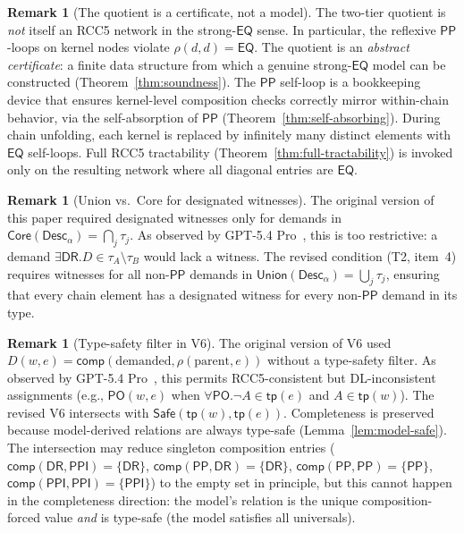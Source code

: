 \documentclass[a4paper,11pt]{article}
\theoremstyle{definition}
\newtheorem{remark}[theorem]{Remark}
\newcommand{\DR}{\ensuremath{\mathsf{DR}}}
\newcommand{\PO}{\ensuremath{\mathsf{PO}}}
\newcommand{\EQ}{\ensuremath{\mathsf{EQ}}}
\newcommand{\PP}{\ensuremath{\mathsf{PP}}}
\newcommand{\PPI}{\ensuremath{\mathsf{PPI}}}
\newcommand{\comp}{\ensuremath{\mathsf{comp}}}
\newcommand{\tp}{\ensuremath{\mathsf{tp}}}
\newcommand{\Desc}{\ensuremath{\mathsf{Desc}}}
\newcommand{\Core}{\ensuremath{\mathsf{Core}}}
\newcommand{\Union}{\ensuremath{\mathsf{Union}}}
\newcommand{\Safe}{\ensuremath{\mathsf{Safe}}}
\begin{document}
\begin{remark}[The quotient is a certificate, not a model]
\label{rem:certificate}
The two-tier quotient is \emph{not} itself an RCC5 network in the
strong-$\EQ$ sense.  In particular, the reflexive $\PP$-loops on
kernel nodes violate $\rho(d,d) = \EQ$.  The quotient is an
\emph{abstract certificate}: a finite data structure from which a
genuine strong-$\EQ$ model can be constructed
(Theorem~\ref{thm:soundness}).  The $\PP$ self-loop is a bookkeeping
device that ensures kernel-level composition checks correctly mirror
within-chain behavior, via the self-absorption of $\PP$
(Theorem~\ref{thm:self-absorbing}).  During chain unfolding, each
kernel is replaced by infinitely many distinct elements with $\EQ$
self-loops.  Full RCC5 tractability
(Theorem~\ref{thm:full-tractability}) is invoked only on the
resulting network where all diagonal entries are $\EQ$.
\end{remark}

\begin{remark}[Union vs.\ Core for designated witnesses]
\label{rem:union}
The original version of this paper required designated witnesses only
for demands in $\Core(\Desc_\alpha) = \bigcap_j \tau_j$.  As
observed by GPT-5.4 Pro~\cite{GPTReview2026}, this is too
restrictive: a demand $\exists\DR.D \in \tau_A \setminus \tau_B$ would
lack a witness.  The revised condition (T2, item~4) requires witnesses
for all non-$\PP$ demands in
$\Union(\Desc_\alpha) = \bigcup_j \tau_j$, ensuring that every chain
element has a designated witness for every non-$\PP$ demand in its
type.
\end{remark}

\begin{remark}[Type-safety filter in V6]\label{rem:safe}
The original version of V6 used
$D(w, e) = \comp(\text{demanded}, \rho(\text{parent}, e))$
without a type-safety filter.  As observed by GPT-5.4
Pro~\cite{GPTReview2026}, this permits RCC5-consistent but
DL-inconsistent assignments (e.g., $\PO(w, e)$ when
$\forall\PO.\neg A \in \tp(e)$ and $A \in \tp(w)$).  The revised V6
intersects with $\Safe(\tp(w), \tp(e))$.  Completeness is preserved
because model-derived relations are always type-safe
(Lemma~\ref{lem:model-safe}).  The intersection may reduce singleton
composition entries ($\comp(\DR, \PPI) = \{\DR\}$,
$\comp(\PP, \DR) = \{\DR\}$, $\comp(\PP, \PP) = \{\PP\}$,
$\comp(\PPI, \PPI) = \{\PPI\}$) to the empty set in principle, but
this cannot happen in the completeness direction: the model's
relation is the unique composition-forced value \emph{and} is
type-safe (the model satisfies all universals).
\end{remark}
\end{document}
